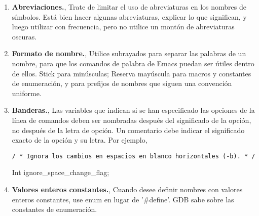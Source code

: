 \begin{enumerate}
\begin{enumerate}
	\item {\bf Abreviaciones.}, Trate de limitar el uso de abreviaturas en los nombres de símbolos. Está bien hacer algunas abreviaturas, explicar lo que significan, y luego utilizar con frecuencia, pero no utilice un montón de abreviaturas oscuras.
	\item {\bf Formato de nombre.}, Utilice subrayados para separar las palabras de un nombre, para que los comandos de palabra de Emacs puedan ser útiles dentro de ellos. Stick para minúsculas; Reserva mayúscula para macros y constantes de enumeración, y para prefijos de nombres que siguen una convención uniforme.
	\item {\bf Banderas.}, Las variables que indican si se han especificado las opciones de la línea de comandos deben ser nombradas después del significado de la opción, no después de la letra de opción. Un comentario debe indicar el significado exacto de la opción y su letra. Por ejemplo,
	\begin{verbatim}
/ * Ignora los cambios en espacios en blanco horizontales (-b). * /
	\end{verbatim}
	Int ignore\_space\_change\_flag;
	\item {\bf Valores enteros constantes.}, Cuando desee definir nombres con valores enteros constantes, use enum en lugar de '\#define'. GDB sabe sobre las constantes de enumeración.
	\end{enumerate}
\end{enumerate}
